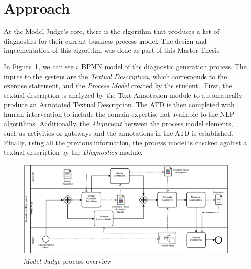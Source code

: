 \section{Approach}
\label{sec:modeljudge_approach}

At the Model Judge's core, there is the algorithm that produces a list of
diagnostics for their current business process model. The design and
implementation of this algorithm was done as part of this Master Thesis.

In Figure~\ref{fig:modeljudge_overview}, we can see a BPMN model of the
diagnostic generation process. The inputs to the system are the \emph{Textual
  Description}, which corresponds to the exercise statement, and the
\emph{Process Model} created by the student.. First, the textual description is
analyzed by the Text Annotation module to automatically produce an Annotated
Textual Description. The ATD is then completed with human intervention to
include the domain expertise not available to the NLP algorithms. Additionally,
 the \textit{Alignment} between the process model elements, such as activities
 or gateways and the annotations in the ATD is established. Finally, using all
 the previous information, the process model is checked against a textual
 description by the \emph{Diagnostics} module.  




\begin{figure}[htb]
  \centering
  \includegraphics[width=\textwidth]{figures/overview_bpmn}
  \caption{\emph{Model Judge} process overview}
  \label{fig:modeljudge_overview}
\end{figure}

